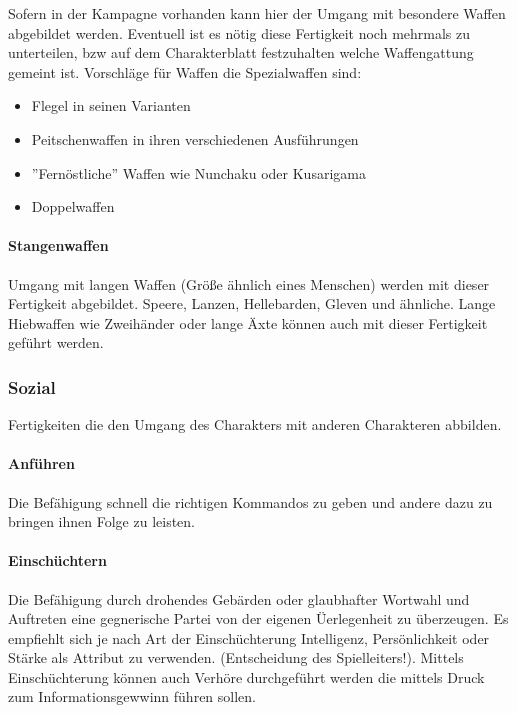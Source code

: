 \documentclass{article}
\begin{document}
Sofern in der Kampagne vorhanden kann hier der Umgang mit besondere Waffen abgebildet werden. Eventuell ist es nötig
diese Fertigkeit noch mehrmals zu unterteilen, bzw auf dem Charakterblatt festzuhalten welche Waffengattung gemeint
ist. Vorschläge für Waffen die Spezialwaffen sind:
\begin{itemize}
\item Flegel in seinen Varianten
\item Peitschenwaffen in ihren verschiedenen Ausführungen
\item ''Fernöstliche'' Waffen wie Nunchaku oder Kusarigama
\item Doppelwaffen
\end{itemize}

\paragraph{Stangenwaffen}

Umgang mit langen Waffen (Größe ähnlich eines Menschen) werden mit dieser Fertigkeit abgebildet. Speere, Lanzen,
Hellebarden, Gleven und ähnliche. Lange Hiebwaffen wie Zweihänder oder lange Äxte können auch mit dieser Fertigkeit
geführt werden.

\subsubsection{Sozial}

Fertigkeiten die den Umgang des Charakters mit anderen Charakteren abbilden.

\paragraph{Anführen}

Die Befähigung schnell die richtigen Kommandos zu geben und andere dazu zu bringen ihnen Folge zu leisten.

\paragraph{Einschüchtern}

Die Befähigung durch drohendes Gebärden oder glaubhafter Wortwahl und Auftreten eine gegnerische Partei von der
eigenen Üerlegenheit zu überzeugen. Es empfiehlt sich je nach Art der Einschüchterung Intelligenz, Persönlichkeit
oder Stärke als Attribut zu verwenden. (Entscheidung des Spielleiters!). Mittels Einschüchterung können auch Verhöre
durchgeführt werden die mittels Druck zum Informationsgewwinn führen sollen.
\end{document}
